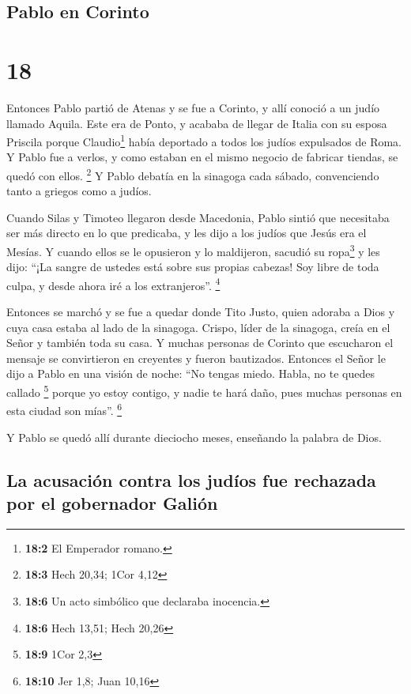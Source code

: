 \hypertarget{pablo-en-corinto}{%
\subsection{Pablo en Corinto}\label{pablo-en-corinto}}

\hypertarget{section-17}{%
\section{18}\label{section-17}}

 Entonces Pablo partió de Atenas y se fue a Corinto,
 y allí conoció a un judío llamado Aquila. Este era de
Ponto, y acababa de llegar de Italia con su esposa Priscila porque
Claudio\footnote{\textbf{18:2} El Emperador romano.} había deportado a
todos los judíos expulsados de Roma. Y Pablo fue a verlos,
 y como estaban en el mismo negocio de fabricar tiendas,
se quedó con ellos. \footnote{\textbf{18:3} Hech 20,34; 1Cor 4,12}
 Y Pablo debatía en la sinagoga cada sábado, convenciendo
tanto a griegos como a judíos.

 Cuando Silas y Timoteo llegaron desde Macedonia, Pablo
sintió que necesitaba ser más directo en lo que predicaba, y les dijo a
los judíos que Jesús era el Mesías.  Y cuando ellos se le
opusieron y lo maldijeron, sacudió su ropa\footnote{\textbf{18:6} Un
  acto simbólico que declaraba inocencia.} y les dijo: ``¡La sangre de
ustedes está sobre sus propias cabezas! Soy libre de toda culpa, y desde
ahora iré a los extranjeros''. \footnote{\textbf{18:6} Hech 13,51; Hech
  20,26}

 Entonces se marchó y se fue a quedar donde Tito Justo,
quien adoraba a Dios y cuya casa estaba al lado de la sinagoga.
 Crispo, líder de la sinagoga, creía en el Señor y también
toda su casa. Y muchas personas de Corinto que escucharon el mensaje se
convirtieron en creyentes y fueron bautizados.  Entonces
el Señor le dijo a Pablo en una visión de noche: ``No tengas miedo.
Habla, no te quedes callado \footnote{\textbf{18:9} 1Cor 2,3}
 porque yo estoy contigo, y nadie te hará daño, pues
muchas personas en esta ciudad son mías''. \footnote{\textbf{18:10} Jer
  1,8; Juan 10,16}

 Y Pablo se quedó allí durante dieciocho meses, enseñando
la palabra de Dios.

\hypertarget{la-acusaciuxf3n-contra-los-juduxedos-fue-rechazada-por-el-gobernador-galiuxf3n}{%
\subsection{La acusación contra los judíos fue rechazada por el
gobernador
Galión}\label{la-acusaciuxf3n-contra-los-juduxedos-fue-rechazada-por-el-gobernador-galiuxf3n}}

